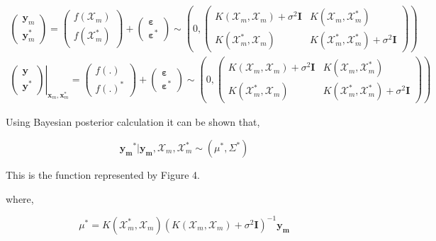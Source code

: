 \documentclass[english]{tktltiki}
\begin{document}
\begin{eqnarray}
\begin{pmatrix}
\mathbf{y}_m \\
\mathbf{y}_m^*
\end{pmatrix}
= %
\begin{pmatrix}
f(\mathcal{X}_m) \\
f(\mathcal{X}_m^*)
\end{pmatrix}
+%
\begin{pmatrix}
\mathbf{\varepsilon} \\
\mathbf{\varepsilon^*}
\end{pmatrix}
\sim \left( %
0, %
\begin{pmatrix}
K(\mathcal{X}_m, \mathcal{X}_m) + \sigma^2 \mathbf{I} & K(\mathcal{X}_m, \mathcal{X}_m^*) \\
K(\mathcal{X}_m^*, \mathcal{X}_m) & K(\mathcal{X}_m^*, \mathcal{X}_m^*) + \sigma^2 \mathbf{I}
\end{pmatrix}\right) \nonumber \\
\left.
\begin{pmatrix}
\mathbf{y} \\
\mathbf{y}^*
\end{pmatrix}
\right\vert_{\mathbf{x}_m, \mathbf{x}_m^*}
= %
\begin{pmatrix}
f(.) \\
f(.)^*
\end{pmatrix}
+%
\begin{pmatrix}
\mathbf{\varepsilon} \\
\mathbf{\varepsilon^*}
\end{pmatrix}
\sim \left( %
0, %
\begin{pmatrix}
K(\mathcal{X}_m, \mathcal{X}_m) + \sigma^2 \mathbf{I} & K(\mathcal{X}_m, \mathcal{X}_m^*) \\
K(\mathcal{X}_m^*, \mathcal{X}_m) & K(\mathcal{X}_m^*, \mathcal{X}_m^*) + \sigma^2 \mathbf{I}
\end{pmatrix}\right)
\end{eqnarray}

Using Bayesian posterior calculation it can be shown that,

\begin{equation}
\mathbf{y_m}^* | \mathbf{y_m}, \mathcal{X}_m, \mathcal{X}_m^* \sim (\mu^*, \Sigma^*)
\end{equation}

This is the function represented by Figure 4.

where,

\begin{equation}
\mu^* = K(\mathcal{X}_m^*, \mathcal{X}_m)(K(\mathcal{X}_m, \mathcal{X}_m) + \sigma^2 \mathbf{I})^{-1}\mathbf{y_m}
\label{gauss_poster_mean}
\end{equation}
\end{document}
